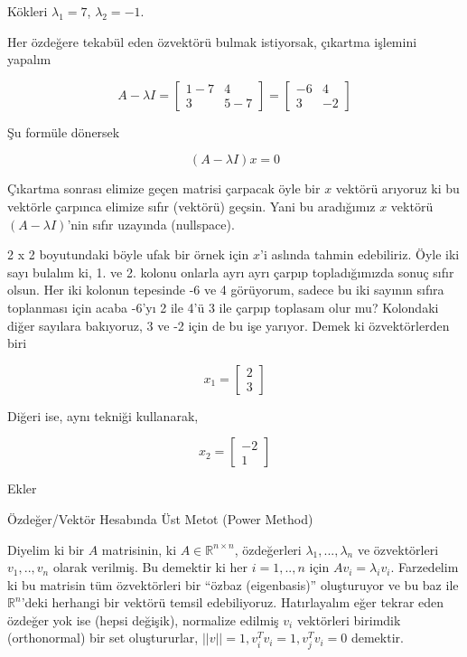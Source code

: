 \documentclass[12pt,fleqn]{article}\usepackage{../../common}
\begin{document}
Kökleri $\lambda_1 = 7$, $\lambda_2 = -1$.

Her özdeğere tekabül eden özvektörü bulmak istiyorsak, çıkartma işlemini
yapalım

$$ 
A - \lambda I = 
\left[\begin{array}{rr}
1-7 & 4 \\ 3 & 5-7
\end{array}\right] = 
\left[\begin{array}{rr}
-6 & 4 \\ 3 & -2
\end{array}\right]
$$

Şu formüle dönersek

$$ (A - \lambda I) x = 0 $$

Çıkartma sonrası elimize geçen matrisi çarpacak öyle bir $x$ vektörü
arıyoruz ki bu vektörle çarpınca elimize sıfır (vektörü) geçsin. Yani bu
aradığımız $x$ vektörü $(A - \lambda I)$'nin sıfır uzayında (nullspace). 

2 x 2 boyutundaki böyle ufak bir örnek için $x$'i aslında tahmin
edebiliriz. Öyle iki sayı bulalım ki, 1. ve 2. kolonu onlarla ayrı ayrı
çarpıp topladığımızda sonuç sıfır olsun. Her iki kolonun tepesinde -6 ve 4
görüyorum, sadece bu iki sayının sıfıra toplanması için acaba -6'yı 2 ile
4'ü 3 ile çarpıp toplasam olur mu? Kolondaki diğer sayılara bakıyoruz, 3 ve
-2 için de bu işe yarıyor. Demek ki özvektörlerden biri 

$$ x_1 = 
\left[\begin{array}{r}
2 \\ 3
\end{array}\right]
$$

Diğeri ise, aynı tekniği kullanarak,

$$ x_2 = 
\left[\begin{array}{r}
-2 \\ 1
\end{array}\right]
$$

Ekler

Özdeğer/Vektör Hesabında Üst Metot (Power Method)

Diyelim ki bir $A$ matrisinin, ki $A \in \mathbb{R}^{n \times n}$, özdeğerleri
$\lambda_1,...,\lambda_n$ ve özvektörleri $v_1,..,v_n$ olarak verilmiş. Bu
demektir ki her $i=1,..,n$ için $Av_i = \lambda_i v_i$. Farzedelim ki bu
matrisin tüm özvektörleri bir ``özbaz (eigenbasis)'' oluşturuyor ve bu baz ile
$\mathbb{R}^n$'deki herhangi bir vektörü temsil edebiliyoruz. Hatırlayalım eğer
tekrar eden özdeğer yok ise (hepsi değişik), normalize edilmiş $v_i$ vektörleri
birimdik (orthonormal) bir set oluştururlar, $||v||=1,v_i^Tv_i=1,v_j^Tv_i=0$
demektir.
\end{document}
